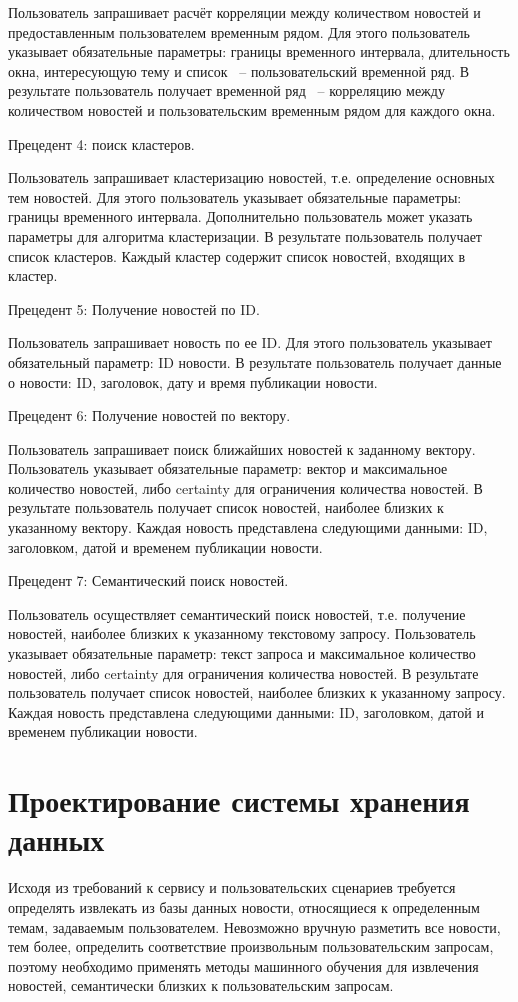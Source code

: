 Пользователь запрашивает расчёт корреляции между количеством новостей и предоставленным пользователем временным рядом. Для этого пользователь указывает обязательные параметры: границы временного интервала, длительность окна, интересующую тему и список ~-- пользовательский временной ряд. В результате пользователь получает временной ряд ~-- корреляцию между количеством новостей и пользовательским временным рядом для каждого окна.

Прецедент 4: поиск кластеров.

Пользователь запрашивает кластеризацию новостей, т.е. определение основных тем новостей. Для этого пользователь указывает обязательные параметры: границы временного интервала. Дополнительно пользователь может указать параметры для алгоритма кластеризации. В результате пользователь получает список кластеров. Каждый кластер содержит список новостей, входящих в кластер.

Прецедент 5: Получение новостей по ID.

Пользователь запрашивает новость по ее ID. Для этого пользователь указывает обязательный параметр: ID новости. В результате пользователь получает данные о новости: ID, заголовок, дату и время публикации новости.

Прецедент 6: Получение новостей по вектору.

Пользователь запрашивает поиск ближайших новостей к заданному вектору. Пользователь указывает обязательные параметр: вектор и максимальное количество новостей, либо certainty для ограничения количества новостей. В результате пользователь получает список новостей, наиболее близких к указанному вектору. Каждая новость представлена следующими данными: ID, заголовком, датой и временем публикации новости.

Прецедент 7: Семантический поиск новостей.

Пользователь осуществляет семантический поиск новостей, т.е. получение новостей, наиболее близких к указанному текстовому запросу. Пользователь указывает обязательные параметр: текст запроса и максимальное количество новостей, либо certainty для ограничения количества новостей. В результате пользователь получает список новостей, наиболее близких к указанному запросу. Каждая новость представлена следующими данными: ID, заголовком, датой и временем публикации новости.

\section{Проектирование системы хранения данных}
Исходя из требований к сервису и пользовательских сценариев требуется определять извлекать из базы данных новости, относящиеся к определенным темам, задаваемым пользователем. Невозможно вручную разметить все новости, тем более, определить соответствие произвольным пользовательским запросам, поэтому необходимо применять методы машинного обучения для извлечения новостей, семантически близких к пользовательским запросам.

